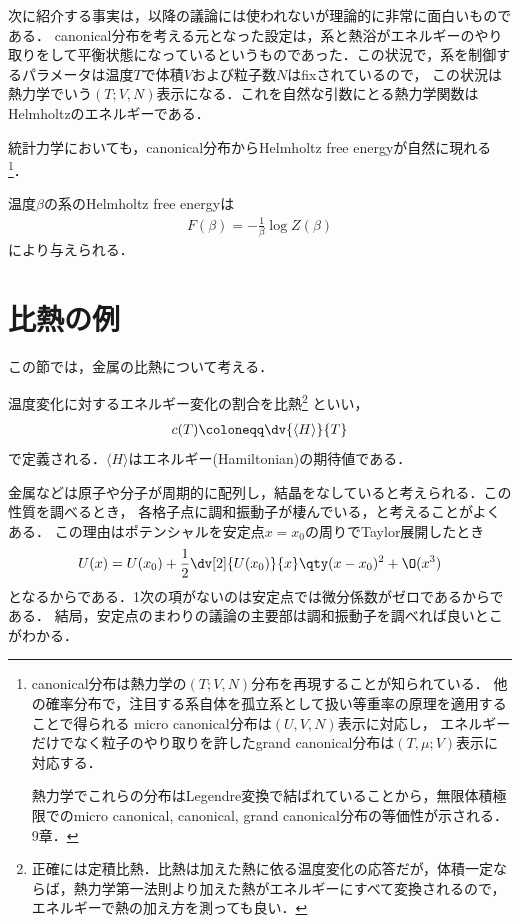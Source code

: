 	次に紹介する事実は，以降の議論には使われないが理論的に非常に面白いものである．
	canonical分布を考える元となった設定は，系と熱浴がエネルギーのやり取りをして平衡状態になっているというものであった．この状況で，系を制御するパラメータは温度$T$で体積$V$および粒子数$N$はfixされているので，
	この状況は熱力学でいう$(T; V, N)$表示になる．これを自然な引数にとる熱力学関数はHelmholtzのエネルギーである．

	統計力学においても，canonical分布からHelmholtz free energyが自然に現れる
	\footnote{
			canonical分布は熱力学の$(T; V, N)$分布を再現することが知られている．
			他の確率分布で，注目する系自体を孤立系として扱い等重率の原理を適用することで得られる
			micro canonical分布は$(U, V, N)$表示に対応し，
			エネルギーだけでなく粒子のやり取りを許したgrand canonical分布は$(T, \mu; V)$表示に対応する．

			熱力学でこれらの分布はLegendre変換で結ばれていることから，無限体積極限でのmicro canonical, canonical, grand canonical分布の等価性が示される．\cite{Tasaki_statmech}9章．
	}．
	\begin{fact}
			温度$\beta$の系のHelmholtz free energyは
			\begin{align}
					F(\beta) = -\frac{1}{\beta}\log Z(\beta) \label{eq:Helmholtz}
			\end{align}
			により与えられる．
	\end{fact}




	\section{比熱の例}\label{sec:heat_capacity}
	この節では，金属の比熱について考える．
	\begin{defn}[比熱]
			温度変化に対するエネルギー変化の割合を比熱\footnote{正確には定積比熱．比熱は加えた熱に依る温度変化の応答だが，体積一定ならば，熱力学第一法則より加えた熱がエネルギーにすべて変換されるので，エネルギーで熱の加え方を測っても良い．}
			といい，
			\begin{align}
					c(T) \coloneqq \dv{\langle H \rangle}{T}
			\end{align}
			で定義される．$\langle H \rangle$はエネルギー(Hamiltonian)の期待値である．
	\end{defn}

	金属などは原子や分子が周期的に配列し，結晶をなしていると考えられる．この性質を調べるとき，
	各格子点に調和振動子が棲んでいる，と考えることがよくある．
	この理由はポテンシャルを安定点$x = x_0$の周りでTaylor展開したとき
	\begin{align}
			U(x) = U(x_0)  + \frac{1}{2}\dv[2]{U(x_0)}{x} \qty(x-x_0)^2  + \O (x^3)
	\end{align}
	となるからである．1次の項がないのは安定点では微分係数がゼロであるからである．
	結局，安定点のまわりの議論の主要部は調和振動子を調べれば良いとこがわかる．

